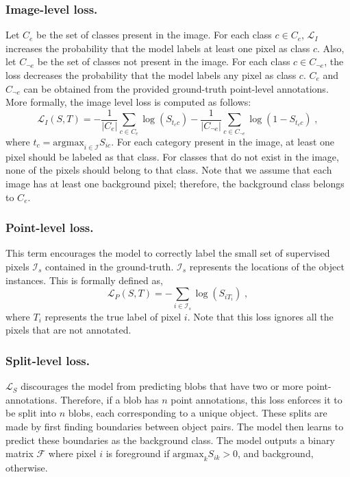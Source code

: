 \documentclass[runningheads]{llncs}
\begin{document}
\subsubsection{Image-level loss.} Let $C_e$ be the set of classes present in the image. For each class $c \in C_e$, $\mathcal{L}_I$ increases the probability that the model labels at least one pixel as class $c$. Also, let $C_{\neg{e}}$ be the set of classes not present in the image. For each class $c \in C_{\neg{e}}$, the loss decreases the probability that the model labels any pixel as class $c$. $C_e$ and $C_{\neg{e}}$ can be obtained from the provided ground-truth point-level annotations. More formally, the image level loss is computed as follows:
\begin{equation}
\mathcal{L}_I(S, T) = -\frac{1}{|C_e|}\sum_{c\in C_e}\log(S_{t_cc}) -\frac{1}{|C_{\neg{e}}|}\sum_{c\in C_{\neg{e}}}\log(1 - S_{t_cc}) \;,
\label{eq:imagelevel}
\end{equation}
where $t_c = \text{argmax}_{i \in \mathcal{I}} S_{ic}$.
For each category present in the image, at least one pixel should be labeled as that class. For classes that do not exist in the image, none of the pixels should belong to that class. Note that we assume that each image has at least one background pixel; therefore, the background class belongs to $C_e$.

\subsubsection{Point-level loss.}This  term encourages the model to correctly label the small set of supervised pixels $\mathcal{I}_s$ contained in the ground-truth. $\mathcal{I}_s$ represents the locations of the object instances. This is formally defined as,
\begin{equation} \label{eq:pointlevel}
\mathcal{L}_P(S, T) = -\sum_{i\in \mathcal{I}_s}\log(S_{iT_i})\;,
\end{equation}
where $T_i$ represents the true label of pixel $i$. Note that this loss ignores all the pixels that are not annotated.

\subsubsection{Split-level loss.} $\mathcal{L}_S$ discourages the model from predicting blobs that have two or more point-annotations. Therefore, if a blob has $n$ point annotations, this loss enforces it to be split into $n$ blobs, each corresponding to a unique object. These splits are made by first finding boundaries between object pairs. The model then learns to predict these boundaries as the background class. The model outputs a binary matrix $\mathcal{F}$ where pixel $i$ is foreground if $\text{argmax}_k S_{ik} > 0$, and background, otherwise.
\end{document}
